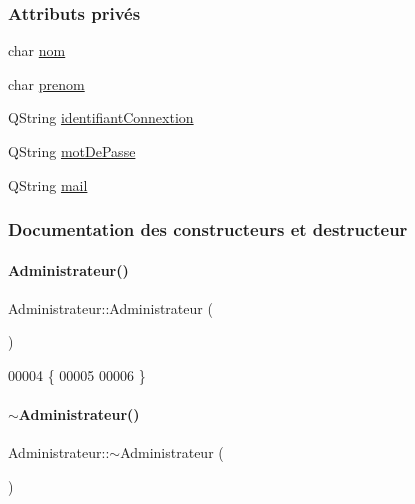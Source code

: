 \subsubsection*{Attributs privés}
\begin{DoxyCompactItemize}
\item 
char \hyperlink{class_administrateur_add094b9c6e352f62dda4802da530eeef}{nom}
\item 
char \hyperlink{class_administrateur_a1cb0671f334a62649e3fc147cc8c97e8}{prenom}
\item 
Q\+String \hyperlink{class_administrateur_ad9b23ebebd0fd973c359962c8bb1520b}{identifiant\+Connextion}
\item 
Q\+String \hyperlink{class_administrateur_aa731eeb89dc7a33a2558ccb77738d333}{mot\+De\+Passe}
\item 
Q\+String \hyperlink{class_administrateur_a9f5f51517d16717ea744fe39ff34e1db}{mail}
\end{DoxyCompactItemize}


\subsubsection{Documentation des constructeurs et destructeur}
\mbox{\label{class_administrateur_a6c8a0ea7ae7d606f0c7ae9f6487759d9}} 
\paragraph{\texorpdfstring{Administrateur()}{Administrateur()}}
{\footnotesize\ttfamily Administrateur\+::\+Administrateur (\begin{DoxyParamCaption}{ }\end{DoxyParamCaption})}


\begin{DoxyCode}
00004 \{
00005 
00006 \}
\end{DoxyCode}
\mbox{\label{class_administrateur_af11ee7b63aabe45c5c2aa0532db1c7db}} 
\paragraph{\texorpdfstring{$\sim$\+Administrateur()}{~Administrateur()}}
{\footnotesize\ttfamily Administrateur\+::$\sim$\+Administrateur (\begin{DoxyParamCaption}{ }\end{DoxyParamCaption})}


